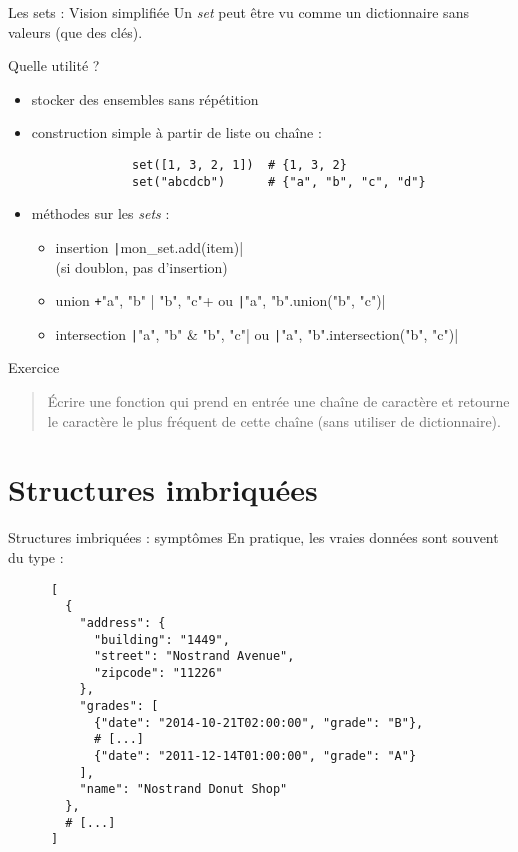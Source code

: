 \documentclass[10pt]{beamer}
\begin{document}
\begin{frame}[fragile]{Les sets : Vision simplifiée}
  Un \emph{set} peut être vu comme un \alert{dictionnaire sans valeurs} (que des clés).

  Quelle utilité ?
  \begin{itemize}
    \item stocker des ensembles sans répétition
    \item construction simple à partir de liste ou chaîne :
          \begin{beamercodeblock}
            \begin{verbatim}
              set([1, 3, 2, 1])  # {1, 3, 2}
              set("abcdcb")      # {"a", "b", "c", "d"}
            \end{verbatim}
          \end{beamercodeblock}
    \item méthodes sur les \emph{sets} :
    \begin{itemize}
      \item insertion    \texttt|mon_set.add(item)| \\ (si doublon, pas d'insertion)
      \item union        \texttt+{"a", "b"} | {"b", "c"}+ ou \texttt|{"a", "b"}.union({"b", "c"})|
      \item intersection \texttt|{"a", "b"} & {"b", "c"}| ou \texttt|{"a", "b"}.intersection({"b", "c"})|
    \end{itemize}
  \end{itemize}
\end{frame}

\begin{frame}[fragile]{Exercice}
  \begin{quote}
    Écrire une fonction qui prend en entrée une chaîne de caractère et retourne le caractère le plus fréquent de cette chaîne (sans utiliser de dictionnaire).
  \end{quote}
\end{frame}

\section{Structures imbriquées}


\begin{frame}[fragile]{Structures imbriquées : symptômes}
  En pratique, les vraies données sont souvent du type :

  \begin{beamercodeblock}
    \begin{verbatim}
      [
        {
          "address": {
            "building": "1449",
            "street": "Nostrand Avenue",
            "zipcode": "11226"
          },
          "grades": [
            {"date": "2014-10-21T02:00:00", "grade": "B"},
            # [...]
            {"date": "2011-12-14T01:00:00", "grade": "A"}
          ],
          "name": "Nostrand Donut Shop"
        },
        # [...]
      ]
    \end{verbatim}
  \end{beamercodeblock}
\end{frame}
\end{document}
